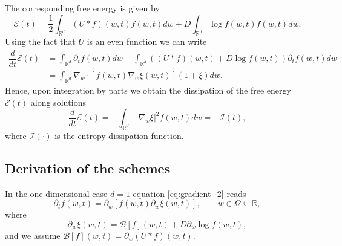 \documentclass[a4paper]{article}
\theoremstyle{remark}\newtheorem{remark}{Remark}
\newcommand{\RR}{\mathbb{R}}
\newcommand{\B}{\mathcal{B}}
\newcommand{\be}{\begin{equation}}
\newcommand{\ee}{\end{equation}}
\begin{document}
The corresponding free energy is given by
\be
\mathcal E(t) = \dfrac{1}{2}\int_{\RR^d}(U*f)(w,t)f(w,t)dw+D\int_{\RR^d}\log f(w,t) f(w,t)dw.
\label{eq:Ent}
\ee 
Using the fact that $U$ is an even function we can write 
\be
\begin{split}
\dfrac{d}{dt}\mathcal E(t) &= \int_{\RR^d} \partial_t f(w,t)dw+ \int_{\RR^d} ((U*f)(w,t)+D\log f(w,t))\partial_t f(w,t)dw\\
&= \int_{\RR^d} \nabla_w \cdot [f(w,t)\nabla_w\xi(w,t)](1+\xi)dw. 
\end{split}
\ee
Hence, upon integration by parts we obtain 
the dissipation of the free energy $\mathcal E(t)$ along solutions 
\be\label{eq:dissipation}
\dfrac{d}{dt}\mathcal E(t) = -\int_{\RR^d}|\nabla_w\xi|^2 f(w,t)dw =- \mathcal I(t),
\ee
where $\mathcal I(\cdot)$ is the entropy dissipation function.
\medskip

\subsection{Derivation of the schemes}
\label{sec:ea}
In the one-dimensional case $d=1$ equation \eqref{eq:gradient_2} reads 
\be
\label{eq:gradient_2b}
\partial_t f(w,t) = \partial_w [f(w,t)\partial_w\xi(w,t)], \qquad w\in\Omega\subseteq\RR,
\ee
where 
\be
\partial_w \xi(w,t) = {\B}[f](w,t) + D {\partial_w \log f(w,t)},
\label{eq:xib}
\ee
and we assume ${\B}[f](w,t)=\partial_w (U \ast f)(w,t)$.
\end{document}
